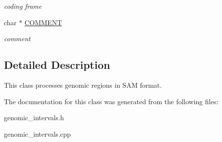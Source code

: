 \begin{CompactItemize}
\begin{CompactList}\small\item\em coding frame \item\end{CompactList}\item 
\hypertarget{classGenomicRegionGFF_625a023f1bb24fc597e723919a036073}{
char $\ast$ \hyperlink{classGenomicRegionGFF_625a023f1bb24fc597e723919a036073}{COMMENT}}
\label{classGenomicRegionGFF_625a023f1bb24fc597e723919a036073}

\begin{CompactList}\small\item\em comment \item\end{CompactList}\end{CompactItemize}


\subsection{Detailed Description}
This class processes genomic regions in SAM format. 

The documentation for this class was generated from the following files:\begin{CompactItemize}
\item 
genomic\_\-intervals.h\item 
genomic\_\-intervals.cpp\end{CompactItemize}
